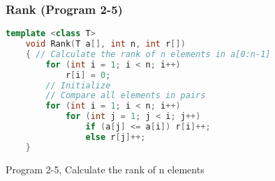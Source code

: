 \documentclass{article}
\begin{document}
\subsubsection{Rank (Program 2-5)}
\begin{lstlisting}[language=C++]
    template <class T>
    void Rank(T a[], int n, int r[])
    { // Calculate the rank of n elements in a[0:n-1]
        for (int i = 1; i < n; i++)
            r[i] = 0;
        // Initialize
        // Compare all elements in pairs
        for (int i = 1; i < n; i++)
            for (int j = 1; j < i; j++)
                if (a[j] <= a[i]) r[i]++;
                else r[j]++;
    }
\end{lstlisting}
\begin{center}
    Program 2-5, Calculate the rank of n elements
\end{center}
\end{document}
